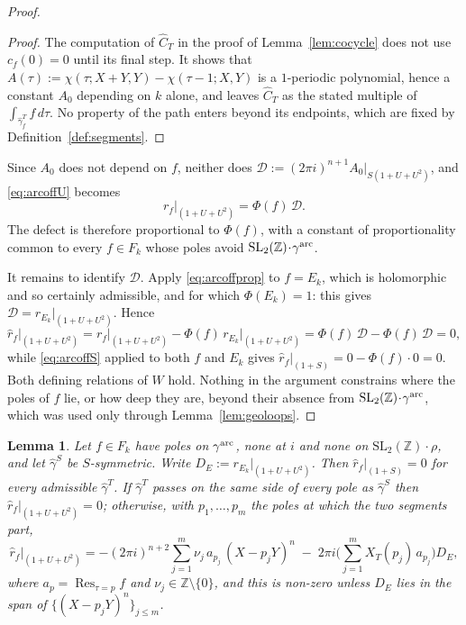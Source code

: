 \documentclass[11pt]{article}
\newtheorem{lemma}[theorem]{Lemma}
\newcommand{\ZZ}{\mathbb{Z}}
\newcommand{\SLZ}{\mathrm{SL}_2(\ZZ)}
\DeclareMathOperator{\Res}{Res}
\begin{document}
\begin{proof}
\begin{proof}
The computation of $\hat C_T$ in the proof of Lemma~\ref{lem:cocycle} does not use $c_f(0)=0$ until
its final step. It shows that $A(\tau):=\chi(\tau;X+Y,Y)-\chi(\tau-1;X,Y)$ is a $1$-periodic
polynomial, hence a constant $A_0$ depending on $k$ alone, and leaves $\hat C_T$ as the stated
multiple of $\int_{\hat\gamma^T_f}f\,d\tau$. No property of the path enters beyond its endpoints,
which are fixed by Definition~\ref{def:segments}.
\end{proof}

Since $A_0$ does not depend on $f$, neither does
$\mathcal D:=(2\pi i)^{n+1}A_0\big|_{S(1+U+U^2)}$, and \eqref{eq:arcoffU} becomes
\begin{equation}\label{eq:arcoffprop}
r_f\big|_{(1+U+U^2)}=\Phi(f)\,\mathcal{D}.
\end{equation}
The defect is therefore proportional to $\Phi(f)$, with a constant of proportionality common to
every $f\in F_k$ whose poles avoid $\SLZ\!\cdot\!\gamma^{\rm arc}$.

It remains to identify $\mathcal D$. Apply \eqref{eq:arcoffprop} to $f=E_k$, which is holomorphic
and so certainly admissible, and for which $\Phi(E_k)=1$: this gives
$\mathcal D=r_{E_k}|_{(1+U+U^2)}$. Hence
\begin{equation*}
\hat r_f\big|_{(1+U+U^2)}
=r_f\big|_{(1+U+U^2)}-\Phi(f)\,r_{E_k}\big|_{(1+U+U^2)}
=\Phi(f)\,\mathcal D-\Phi(f)\,\mathcal D=0 ,
\end{equation*}
while \eqref{eq:arcoffS} applied to both $f$ and $E_k$ gives
$\hat r_f|_{(1+S)}=0-\Phi(f)\cdot 0=0$. Both defining relations of $W$ hold. Nothing in the
argument constrains where the poles of $f$ lie, or how deep they are, beyond their absence
from $\SLZ\!\cdot\!\gamma^{\rm arc}$, which was used only through Lemma~\ref{lem:geoloops}.
\end{proof}

\begin{lemma}\label{lem:arcon}
Let $f\in F_k$ have poles on $\gamma^{\rm arc}$, none at $i$ and none on $\SLZ\!\cdot\!\rho$, and
let $\hat\gamma^S$ be $S$-symmetric. Write $D_E:=r_{E_k}\big|_{(1+U+U^2)}$. Then
$\hat r_f\big|_{(1+S)}=0$ for every admissible $\hat\gamma^T$. If $\hat\gamma^T$ passes on the same
side of every pole as $\hat\gamma^S$ then $\hat r_f\big|_{(1+U+U^2)}=0$; otherwise, with
$p_1,\dots,p_m$ the poles at which the two segments part,
\begin{equation}\label{eq:arcondefect}
\hat r_f\big|_{(1+U+U^2)}
=-(2\pi i)^{n+2}\sum_{j=1}^{m}\nu_j\,a_{p_j}\,(X-p_jY)^{n}
\;-\;2\pi i\Big(\sum_{j=1}^{m}X_T(p_j)\,a_{p_j}\Big)D_E ,
\end{equation}
where $a_p=\Res_{\tau=p}f$ and $\nu_j\in\ZZ\setminus\{0\}$, and this is non-zero unless $D_E$ lies
in the span of $\{(X-p_jY)^{n}\}_{j\le m}$.
\end{lemma}
\end{document}
